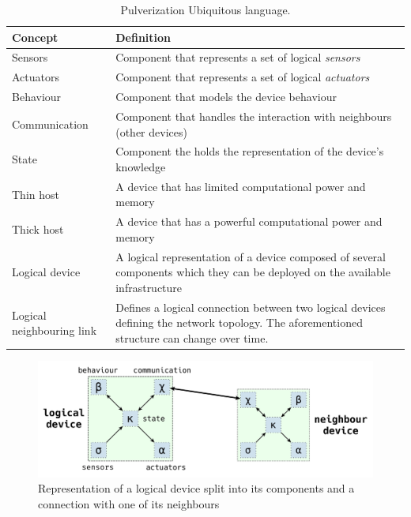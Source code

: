 \begin{table}
	\begin{tabularx}{\textwidth}{l X}
		\toprule
		\textbf{Concept}          & \textbf{Definition}                                                                                             \\
		\midrule
		Sensors                   & Component that represents a set of logical \emph{sensors}                                                       \\
		Actuators                 & Component that represents a set of logical \emph{actuators}                                                     \\
		Behaviour                 & Component that models the device behaviour                                                                      \\
		Communication             & Component that handles the interaction with neighbours (other devices)                                          \\
		State                     & Component the holds the representation of the device's knowledge                                                \\
		Thin host                 & A device that has limited computational power and memory                                                        \\
		Thick host                & A device that has a powerful computational power and memory                                                     \\
		Logical device            & A logical representation of a device composed of several components which they can be deployed on the available
		infrastructure                                                                                                                              \\
		Logical neighbouring link & Defines a logical connection between two logical devices defining the network topology.
		The aforementioned structure can change over time.                                                                                          \\
		\bottomrule
	\end{tabularx}
	\caption{Pulverization Ubiquitous language.}
	\label{tab:ubiquitous-language}
\end{table}

\begin{figure}
	\centering
	\includegraphics[width=\textwidth]{figures/original-components-interactions.pdf}
	\caption{Representation of a logical device split into its components and a connection with one of its neighbours}
	\label{fig:logical-device}
\end{figure}

